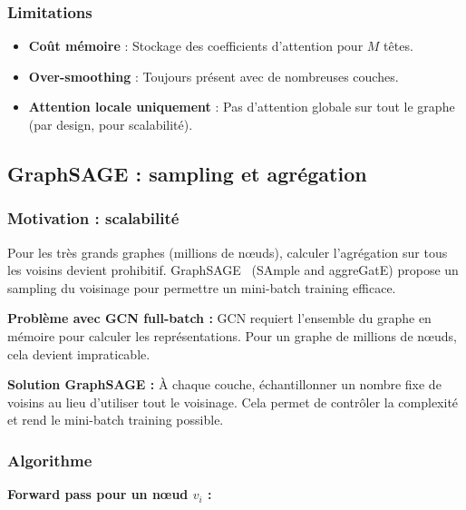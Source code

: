 \subsubsection{Limitations}

\begin{itemize}
    \item \textbf{Coût mémoire} : Stockage des coefficients d'attention pour $M$ têtes.
    \item \textbf{Over-smoothing} : Toujours présent avec de nombreuses couches.
    \item \textbf{Attention locale uniquement} : Pas d'attention globale sur tout le graphe (par design, pour scalabilité).
\end{itemize}

\subsection{GraphSAGE : sampling et agrégation}

\subsubsection{Motivation : scalabilité}

Pour les très grands graphes (millions de nœuds), calculer l'agrégation sur tous les voisins devient prohibitif. GraphSAGE~\cite{Hamilton2017} (SAmple and aggreGatE) propose un sampling du voisinage pour permettre un mini-batch training efficace.

\textbf{Problème avec GCN full-batch :}
GCN requiert l'ensemble du graphe en mémoire pour calculer les représentations. Pour un graphe de millions de nœuds, cela devient impraticable.

\textbf{Solution GraphSAGE :}
À chaque couche, échantillonner un nombre fixe de voisins au lieu d'utiliser tout le voisinage. Cela permet de contrôler la complexité et rend le mini-batch training possible.

\subsubsection{Algorithme}

\textbf{Forward pass pour un nœud $v_i$ :}

